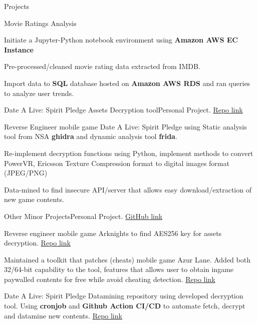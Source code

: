 \documentclass{resume} %
\begin{document}
\begin{rSection}{Projects}
    \begin{rSubsection}{Movie Ratings Analysis}{}{}{}
        \item Initiate a Jupyter-Python notebook environment using \textbf{Amazon AWS EC Instance}
        \item Pre-processed/cleaned movie rating data extracted from IMDB.
        \item Import data to \textbf{SQL} database hosted on \textbf{Amazon AWS RDS} and ran queries to analyze user trends.
    \end{rSubsection}

    \begin{rSubsection}{Date A Live: Spirit Pledge Assets Decryption tool}{}{Personal Project. \href{https://github.com/n0k0m3/DALSP-Assets-Decryption-tool}{Repo link}}{}
        \item Reverse Engineer mobile game Date A Live: Spirit Pledge using Static analysis tool from NSA \textbf{ghidra} and dynamic analysis tool \textbf{frida}.
        \item Re-implement decryption functions using Python, implement methods to convert PowerVR, Ericsson Texture Compression format to digital images format (JPEG/PNG)
        \item Data-mined to find insecure API/server that allows easy download/extraction of new game contents.
    \end{rSubsection}
    \begin{rSubsection}{Other Minor Projects}{}{Personal Project. \href{https://github.com/n0k0m3}{GitHub link}}{}
        \item Reverse engineer mobile game Arknights to find AES256 key for assets decryption. \href{https://github.com/n0k0m3/Arknights-Lua-Decrypter}{Repo link}
        \item Maintained a toolkit that patches (cheats) mobile game Azur Lane. Added both 32/64-bit capability to the tool, features that allows user to obtain ingame paywalled contents for free while avoid cheating detection. \href{https://github.com/n0k0m3/Azur-Lane-Scripts-Autopatcher}{Repo link}
        \item Date A Live: Spirit Pledge Datamining repository using developed decryption tool. Using \textbf{cronjob} and \textbf{Github Action CI/CD} to automate fetch, decrypt and datamine new contents. \href{https://github.com/n0k0m3/DateALiveData}{Repo link}
    \end{rSubsection}

\end{rSection}
\end{document}
